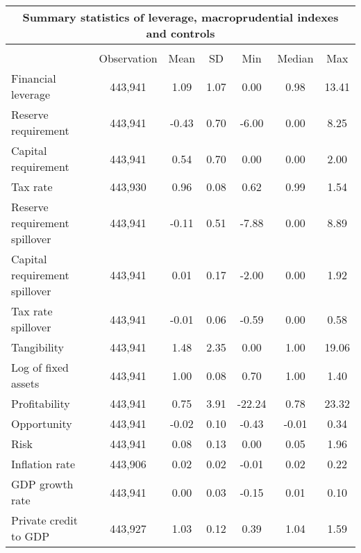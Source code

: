 \begin{table}[htbp]\centering
\begin{tabular}{l*{1}{cccccc}}
	\multicolumn{7}{c}{Summary statistics of leverage, macroprudential indexes and controls}\\
\hline\hline
                    &\multicolumn{6}{c}{}                                                         \\
                    &       Observation&        Mean&          SD&         Min&         Median&         Max\\
\hline
Financial leverage  &      443,941&        1.09&        1.07&        0.00&        0.98&       13.41\\
Reserve requirement &      443,941&       -0.43&        0.70&       -6.00&        0.00&        8.25\\
Capital requirement &      443,941&        0.54&        0.70&        0.00&        0.00&        2.00\\
Tax rate            &      443,930&        0.96&        0.08&        0.62&        0.99&        1.54\\
Reserve requirement spillover&      443,941&       -0.11&        0.51&       -7.88&        0.00&        8.89\\
Capital requirement spillover&      443,941&        0.01&        0.17&       -2.00&        0.00&        1.92\\
Tax rate spillover  &      443,941&       -0.01&        0.06&       -0.59&       0.00&        0.58\\
Tangibility         &      443,941&        1.48&        2.35&        0.00&        1.00&       19.06\\
Log of fixed assets &      443,941&        1.00&        0.08&        0.70&        1.00&        1.40\\
Profitability       &      443,941&        0.75&        3.91&      -22.24&        0.78&       23.32\\
Opportunity         &      443,941&       -0.02&        0.10&       -0.43&       -0.01&        0.34\\
Risk                &      443,941&        0.08&        0.13&        0.00&        0.05&        1.96\\
Inflation rate      &      443,906&        0.02&        0.02&       -0.01&        0.02&        0.22\\
GDP growth rate     &      443,941&        0.00&        0.03&       -0.15&        0.01&        0.10\\
Private credit to GDP&      443,927&        1.03&        0.12&        0.39&        1.04&        1.59\\

\end{tabular}
\end{table}
